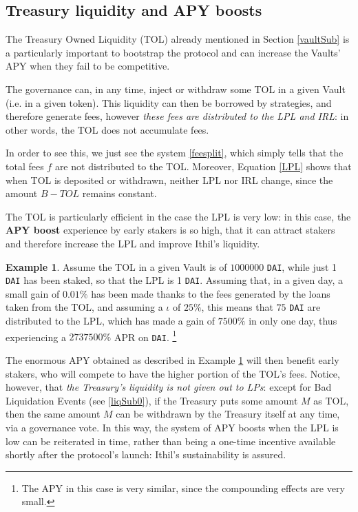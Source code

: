 \documentclass[a4paper,10 pt]{article}
\theoremstyle{definition}
\newtheorem{example}{Example}
\begin{document}
\subsection{Treasury liquidity and APY boosts}\label{glSub}

The Treasury Owned Liquidity (TOL) already mentioned in Section \ref{vaultSub} is a particularly important to bootstrap the protocol and can increase the Vaults' APY when they fail to be competitive.

The governance can, in any time, inject or withdraw some TOL in a given Vault (i.e. in a given token). This liquidity can then be borrowed by strategies, and therefore generate fees, however {\it these fees are distributed to the LPL and IRL}: in other words, the TOL does not accumulate fees.

In order to see this, we just see the system \eqref{feesplit}, which simply tells that the total fees $f$ are not distributed to the TOL. Moreover, Equation \eqref{LPL} shows that when TOL is deposited or withdrawn, neither LPL nor IRL change, since the amount $B - TOL$ remains constant.

The TOL is particularly efficient in the case the LPL is very low: in this case, the {\bf APY boost} experience by early stakers is so high, that it can attract stakers and therefore increase the LPL and improve Ithil's liquidity.

\begin{example}\label{bigapy}
Assume the TOL in a given Vault is of $1000000$ \verb|DAI|, while just 1 \verb|DAI| has been staked, so that the LPL is 1 \verb|DAI|. Assuming that, in a given day, a small gain of $0.01\%$ has been made thanks to the fees generated by the loans taken from the TOL, and assuming a $\iota$ of $25\%$, this means that $75$ \verb|DAI| are distributed to the LPL, which has made a gain of $7500\%$ in only one day, thus experiencing a $2737500\%$ APR on \verb|DAI|. \footnote{The APY in this case is very similar, since the compounding effects are very small.}
\end{example}

 The enormous APY obtained as described in Example \ref{bigapy} will then benefit early stakers, who will compete to have the higher portion of the TOL's fees. Notice, however, that {\it the Treasury's liquidity is not given out to LPs}: except for Bad Liquidation Events (see \ref{liqSub0}), if the Treasury puts some amount $M$ as TOL, then the same amount $M$ can be withdrawn by the Treasury itself at any time, via a governance vote. In this way, the system of APY boosts when the LPL is low can be reiterated in time, rather than being a one-time incentive available shortly after the protocol's launch: Ithil's sustainability is assured.
\end{document}
